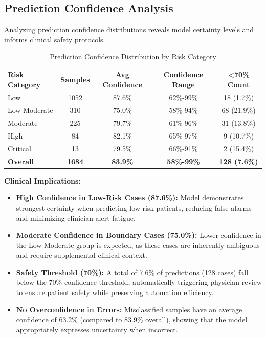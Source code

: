 \documentclass[3p,times,procedia]{elsarticle}
\begin{document}
\subsection{Prediction Confidence Analysis}
Analyzing prediction confidence distributions reveals model certainty levels and informs clinical safety protocols.

\begin{table}[!ht]
\centering
\caption{Prediction Confidence Distribution by Risk Category}
\small
\begin{tabular}{|l|c|c|c|c|}
\hline
\rowcolor{gray!20}
\textbf{Risk Category} & \textbf{Samples} & \textbf{Avg Confidence} & \textbf{Confidence Range} & \textbf{<70\% Count} \\
\hline
Low & 1052 & 87.6\% & 62\%-99\% & 18 (1.7\%) \\
\rowcolor{gray!10}
Low-Moderate & 310 & 75.0\% & 58\%-94\% & 68 (21.9\%) \\
Moderate & 225 & 79.7\% & 61\%-96\% & 31 (13.8\%) \\
\rowcolor{gray!10}
High & 84 & 82.1\% & 65\%-97\% & 9 (10.7\%) \\
Critical & 13 & 79.5\% & 66\%-91\% & 2 (15.4\%) \\
\hline
\rowcolor{gray!20}
\textbf{Overall} & \textbf{1684} & \textbf{83.9\%} & \textbf{58\%-99\%} & \textbf{128 (7.6\%)} \\
\hline
\end{tabular}
\end{table}


\textbf{Clinical Implications:}
\begin{itemize}

    \item \textbf{High Confidence in Low-Risk Cases (87.6\%):}
    Model demonstrates strongest certainty when predicting low-risk patients, reducing false alarms and minimizing clinician alert fatigue.

    \item \textbf{Moderate Confidence in Boundary Cases (75.0\%):}
    Lower confidence in the Low-Moderate group is expected, as these cases are inherently ambiguous and require supplemental clinical context.

    \item \textbf{Safety Threshold (70\%):}
    A total of 7.6\% of predictions (128 cases) fall below the 70\% confidence threshold, automatically triggering physician review to ensure patient safety while preserving automation efficiency.

    \item \textbf{No Overconfidence in Errors:}
    Misclassified samples have an average confidence of 63.2\% (compared to 83.9\% overall), showing that the model appropriately expresses uncertainty when incorrect.

\end{itemize}
\end{document}
